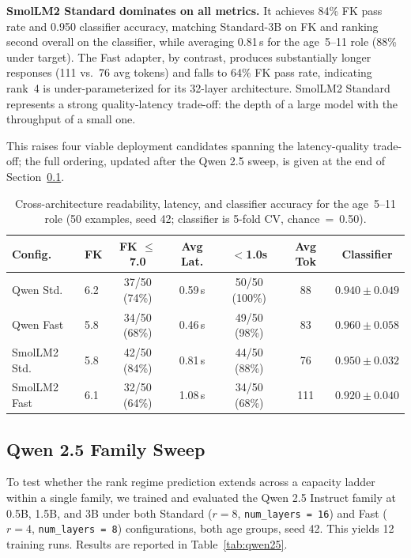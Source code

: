 \documentclass[ASNA,twocolumn]{USG} %
\begin{document}
\textbf{SmolLM2 Standard dominates on all metrics.} It achieves 84\% FK pass rate and 0.950 classifier accuracy, matching Standard-3B on FK and ranking second overall on the classifier, while averaging 0.81\,s for the age~5--11 role (88\% under target). The Fast adapter, by contrast, produces substantially longer responses (111 vs.\ 76 avg tokens) and falls to 64\% FK pass rate, indicating rank~4 is under-parameterized for its 32-layer architecture. SmolLM2 Standard represents a strong quality-latency trade-off: the depth of a large model with the throughput of a small one.

This raises four viable deployment candidates spanning the latency-quality trade-off; the full ordering, updated after the Qwen 2.5 sweep, is given at the end of Section~\ref{sec:qwen25}.

\begin{table}[!t]
  \centering
  \caption{Cross-architecture readability, latency, and classifier accuracy for the age~5--11 role (50 examples, seed 42; classifier is 5-fold CV, chance~=~0.50).}
  \label{tab:crossarch}
  \footnotesize
  \begin{tabular}{llccccc}
    \hline
    Config. & FK & FK $\leq$7.0 & Avg Lat. & $<$1.0s & Avg Tok & Classifier \\
    \hline
    Qwen Std.    & 6.2 & 37/50 (74\%) & 0.59\,s & 50/50 (100\%) & 88  & $0.940 \pm 0.049$ \\
    Qwen Fast    & 5.8 & 34/50 (68\%) & 0.46\,s & 49/50 (98\%)  & 83  & $0.960 \pm 0.058$ \\
    SmolLM2 Std. & 5.8 & 42/50 (84\%) & 0.81\,s & 44/50 (88\%)  & 76  & $0.950 \pm 0.032$ \\
    SmolLM2 Fast & 6.1 & 32/50 (64\%) & 1.08\,s & 34/50 (68\%)  & 111 & $0.920 \pm 0.040$ \\
    \hline
  \end{tabular}
\end{table}

\subsection{Qwen 2.5 Family Sweep}\label{sec:qwen25}

To test whether the rank regime prediction extends across a capacity ladder within a single family, we trained and evaluated the Qwen 2.5 Instruct family at 0.5B, 1.5B, and 3B under both Standard ($r=8$, \texttt{num\_layers~=~16}) and Fast ($r=4$, \texttt{num\_layers~=~8}) configurations, both age groups, seed 42. This yields 12 training runs. Results are reported in Table~\ref{tab:qwen25}.
\end{document}
